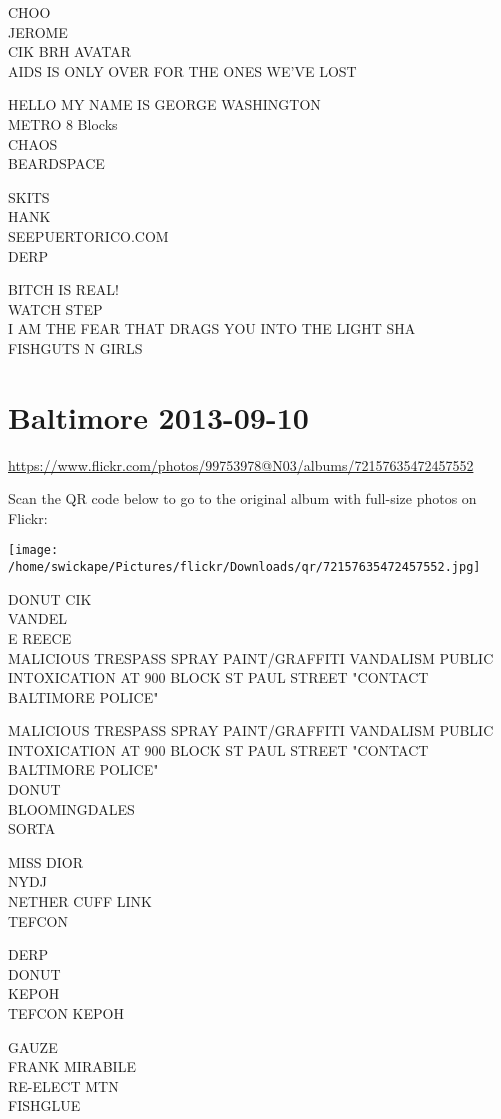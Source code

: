 \documentclass[10pt,letterpaper]{article}
\begin{document}
CHOO\\
JEROME\\
CIK BRH AVATAR\\
AIDS IS ONLY OVER FOR THE ONES WE'VE LOST

HELLO MY NAME IS GEORGE WASHINGTON\\
METRO 8 Blocks\\
CHAOS\\
BEARDSPACE

SKITS\\
HANK\\
SEEPUERTORICO.COM\\
DERP

BITCH IS REAL!\\
WATCH STEP\\
I AM THE FEAR THAT DRAGS YOU INTO THE LIGHT SHA\\
FISHGUTS N GIRLS


\section*{Baltimore 2013-09-10}

\url{https://www.flickr.com/photos/99753978@N03/albums/72157635472457552}

Scan the QR code below to go to the original album with full-size photos on Flickr:

\texttt{[image: /home/swickape/Pictures/flickr/Downloads/qr/72157635472457552.jpg]}


DONUT CIK\\
VANDEL\\
E REECE\\
MALICIOUS TRESPASS SPRAY PAINT/GRAFFITI VANDALISM PUBLIC INTOXICATION AT 900 BLOCK ST PAUL STREET "CONTACT BALTIMORE POLICE"

MALICIOUS TRESPASS SPRAY PAINT/GRAFFITI VANDALISM PUBLIC INTOXICATION AT 900 BLOCK ST PAUL STREET "CONTACT BALTIMORE POLICE"\\
DONUT\\
BLOOMINGDALES\\
SORTA

MISS DIOR\\
NYDJ\\
NETHER CUFF LINK\\
TEFCON

DERP\\
DONUT\\
KEPOH\\
TEFCON KEPOH

GAUZE\\
FRANK MIRABILE\\
RE{-}ELECT MTN\\
FISHGLUE
\end{document}
